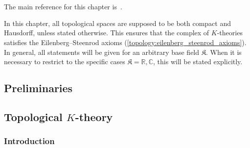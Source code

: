 \chapter{\texorpdfstring{}{K-theory}}\label{chapter:k}

    The main reference for this chapter is~\citet{karoubi_k-theory_1978}.

    In this chapter, all topological spaces are supposed to be both compact and Hausdorff, unless stated otherwise. This ensures that the complex of $K$-theories satisfies the Eilenberg--Steenrod axioms (\cref{topology:eilenberg_steenrod_axioms}). In general, all statements will be given for an arbitrary base field $\mathfrak{K}$. When it is necessary to restrict to the specific cases $\mathfrak{K}=\mathbb{R},\mathbb{C}$, this will be stated explicitly.

    \minitoc

\section{Preliminaries}


\section{\texorpdfstring{Topological $K$-theory}{Topological K-theory}}
\subsection{Introduction}

